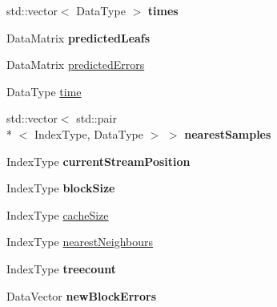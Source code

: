 \begin{DoxyCompactItemize}
\item 
\hypertarget{classffactory_1_1_stream_prox_cache_a52a9ca2720ad7248f5125abab1cacdaf}{std\-::vector$<$ Data\-Type $>$ {\bfseries times}}\label{classffactory_1_1_stream_prox_cache_a52a9ca2720ad7248f5125abab1cacdaf}

\item 
\hypertarget{classffactory_1_1_stream_prox_cache_a0fe49988981608bbf56de62df5f7e890}{Data\-Matrix {\bfseries predicted\-Leafs}}\label{classffactory_1_1_stream_prox_cache_a0fe49988981608bbf56de62df5f7e890}

\item 
Data\-Matrix \hyperlink{classffactory_1_1_stream_prox_cache_a732bbc8e3b41d6fd9c12558bad80d031}{predicted\-Errors}
\item 
Data\-Type \hyperlink{classffactory_1_1_stream_prox_cache_a3626cb46c72194156648c61c210203be}{time}
\item 
\hypertarget{classffactory_1_1_stream_prox_cache_a0a24df85ffa934c509b94b8560e80f07}{std\-::vector$<$ std\-::pair\\*
$<$ Index\-Type, Data\-Type $>$ $>$ {\bfseries nearest\-Samples}}\label{classffactory_1_1_stream_prox_cache_a0a24df85ffa934c509b94b8560e80f07}

\item 
\hypertarget{classffactory_1_1_stream_prox_cache_a1bab52a2fde55818bd262dbd9894225a}{Index\-Type {\bfseries current\-Stream\-Position}}\label{classffactory_1_1_stream_prox_cache_a1bab52a2fde55818bd262dbd9894225a}

\item 
\hypertarget{classffactory_1_1_stream_prox_cache_a35d64dcadac9784987a491cd080435b1}{Index\-Type {\bfseries block\-Size}}\label{classffactory_1_1_stream_prox_cache_a35d64dcadac9784987a491cd080435b1}

\item 
Index\-Type \hyperlink{classffactory_1_1_stream_prox_cache_a994b7d54a8341bc3a4f20da808bc7f5c}{cache\-Size}
\item 
Index\-Type \hyperlink{classffactory_1_1_stream_prox_cache_a438552682a58bdd977b171d1ae568033}{nearest\-Neighbours}
\item 
\hypertarget{classffactory_1_1_stream_prox_cache_a1396a4217b4e79fb3e2771cea5c47cd3}{Index\-Type {\bfseries treecount}}\label{classffactory_1_1_stream_prox_cache_a1396a4217b4e79fb3e2771cea5c47cd3}

\item 
\hypertarget{classffactory_1_1_stream_prox_cache_afd33d8b1fb40b3acc282fa0f12d053dc}{Data\-Vector {\bfseries new\-Block\-Errors}}\label{classffactory_1_1_stream_prox_cache_afd33d8b1fb40b3acc282fa0f12d053dc}


\end{DoxyCompactItemize}
